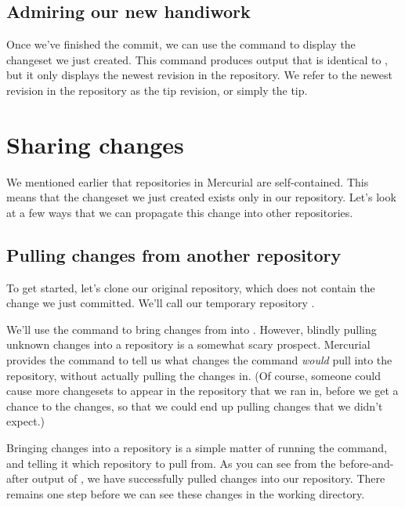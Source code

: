 \subsection{Admiring our new handiwork}

Once we've finished the commit, we can use the  command to
display the changeset we just created.  This command produces output
that is identical to , but it only displays the newest
revision in the repository.
We refer to the newest revision in the repository as the tip revision,
or simply the tip.

\section{Sharing changes}

We mentioned earlier that repositories in Mercurial are
self-contained.  This means that the changeset we just created exists
only in our  repository.  Let's look at a few ways
that we can propagate this change into other repositories.

\subsection{Pulling changes from another repository}
\label{sec:tour:pull}

To get started, let's clone our original  repository,
which does not contain the change we just committed.  We'll call our
temporary repository .

We'll use the  command to bring changes from
 into .  However, blindly
pulling unknown changes into a repository is a somewhat scary
prospect.  Mercurial provides the  command to tell us
what changes the  command \emph{would} pull into the
repository, without actually pulling the changes in.
(Of course, someone could cause more changesets to appear in the
repository that we ran  in, before we get a chance to
 the changes, so that we could end up pulling changes that we
didn't expect.)

Bringing changes into a repository is a simple matter of running the
 command, and telling it which repository to pull from.
As you can see from the before-and-after output of , we
have successfully pulled changes into our repository.  There remains
one step before we can see these changes in the working directory.

